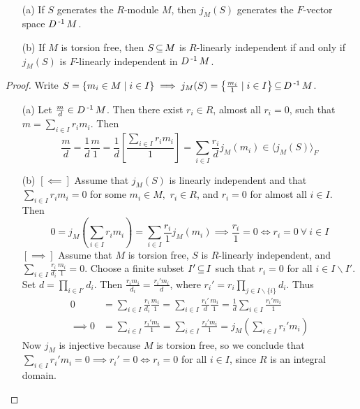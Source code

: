 \documentclass[11pt]{book}
\theoremstyle{definition}   \newtheorem{defn}[counter]{Definition} %
\newcommand{\bs}{\backslash}   \newcommand{\A}{\mathcal{A}}   \newcommand{\sy}{\textnormal{Syl}}   \newcommand{\size}[1]{\left| #1 \right|}
\newcommand{\gen}[1]{\langle #1 \rangle}   \newcommand{\stab}[2]{\tn{Stab}_{#1}(#2)}   \newcommand{\fix}[2]{\tn{Fix}_{#1}(#2)}   \newcommand{\op}{^{\tn{op}}}
\numberwithin{counter}{chapter}
\begin{document}
\begin{lemma}\
\begin{enumerate}
\item[(a)] If $S$ generates the $R$-module $M$, then $j_M(S)$ generates the $F$-vector space $D\operatorname{^{-1}} M$.
\item[(b)] If $M$ is torsion free, then $S \operatorname{\subseteq} M$ is $R$-linearly independent if and only if $j_M(S)$ is $F$-linearly independent in $D\operatorname{^{-1}} M$.
\end{enumerate}
\end{lemma}

\begin{proof} Write $S = \{m_i \in M \mid i \in I\} \implies j_M(S) = \left\{ \frac{m_i}{1} \mid i \in I \right\} \operatorname{\subseteq} D\operatorname{^{-1}} M$.
\begin{enumerate}
\item[(a)] Let $\frac{m}{d} \in D\operatorname{^{-1}} M$. Then there exist $r_i \in R$, almost all $r_i = 0$, such that $m = \sum_{i \in I} r_i m_i$. Then
	\[\frac{m}{d} = \frac{1}{d} \frac{m}{1} = \frac{1}{d} \left[\frac{\sum_{i \in I} r_i m_i}{1}\right] = \sum_{i \in I} \frac{r_i}{d} j_M(m_i) \in \gen{j_M(S)}_F \]
\item[(b)] $[\impliedby]$ Assume that $j_M(S)$ is linearly independent and that $\sum_{i \in I} r_i m_i = 0$ for some $m_i \in M,$ $r_i \in R$, and $r_i = 0$ for almost all $i \in I$. Then
	\[0 = j_M \left(\sum_{i \in I} r_i m_i\right) = \sum_{i \in I} \frac{r_i}{1} j_M(m_i) \implies \frac{r_i}{1} = 0 \iff r_i = 0 \ \forall \ i \in I \]
$[\implies]$ Assume that $M$ is torsion free, $S$ is $R$-linearly independent, and $\sum_{i \in I} \frac{r_i}{d_i} \frac{m_i}{1} = 0$. Choose a finite subset $I' \operatorname{\subseteq} I$ such that $r_i = 0$ for all $i \in I \bs I'$. Set $d = \prod_{i \in I'} d_i$. Then $\frac{r_i m_i}{d_i} = \frac{r_i' m_i}{d}$, where $r_i' = r_i \prod_{j \in I \bs \{i\}} d_i$. Thus
\begin{align*}
0 &= \sum_{i \in I} \frac{r_i}{d_i} \frac{m_i}{1} = \sum_{i \in I} \frac{r_i'}{d} \frac{m_i}{1} = \frac{1}{d} \sum_{i \in I} \frac{r_i' m_i}{1} \\
\implies 0 &= \sum_{i \in I} \frac{r_i' m_i}{1} = \sum_{i \in I} \frac{r_i' m_i}{1} = j_M\left(\sum_{i \in I} r_i' m_i\right)
\end{align*}
Now $j_M$ is injective because $M$ is torsion free, so we conclude that $\sum_{i \in I} r_i' m_i = 0 \implies r_i' = 0 \iff r_i = 0$ for all $i \in I$, since $R$ is an integral domain.
\end{enumerate}
\end{proof}
\end{document}
